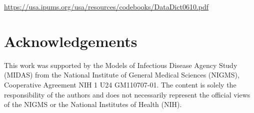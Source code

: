 \documentclass{article}
\begin{document}
\vspace{2em}
	\url{https://usa.ipums.org/usa/resources/codebooks/DataDict0610.pdf}
\vspace{2em}

\newpage 
\section{Acknowledgements}
This work was supported by the Models of Infectious Disease Agency Study (MIDAS) from the National Institute of General Medical Sciences (NIGMS), Cooperative Agreement NIH 1 U24 GM110707-01. The content is solely the responsibility of the authors and does not necessarily represent the official views of the NIGMS or the National Institutes of Health (NIH).
\end{document}
